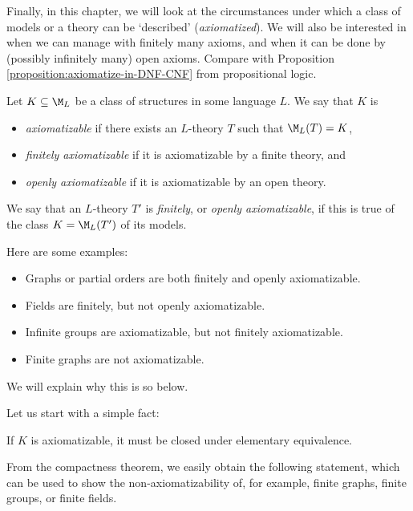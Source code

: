 Finally, in this chapter, we will look at the circumstances under which a class of models or a theory can be `described' (\emph{axiomatized}). We will also be interested in when we can manage with finitely many axioms, and when it can be done by (possibly infinitely many) open axioms. Compare with Proposition \ref{proposition:axiomatize-in-DNF-CNF} from propositional logic.

\begin{definition}[Axiomatizability]
Let $K \subseteq \M_L$ be a class of structures in some language $L$. We say that $K$ is
\begin{itemize}
    \item \emph{axiomatizable} if there exists an $L$-theory $T$ such that $\M_L(T)=K$,
    \item \emph{finitely axiomatizable} if it is axiomatizable by a finite theory, and
    \item \emph{openly axiomatizable} if it is axiomatizable by an open theory.
\end{itemize}
We say that an $L$-theory $T'$ is \emph{finitely}, or \emph{openly axiomatizable}, if this is true of the class $K=\M_L(T')$ of its models.
\end{definition}

\begin{example}
    Here are some examples:
    \begin{itemize}
        \item Graphs or partial orders are both finitely and openly axiomatizable.
        \item Fields are finitely, but not openly axiomatizable.
        \item Infinite groups are axiomatizable, but not finitely axiomatizable.
        \item Finite graphs are not axiomatizable.
    \end{itemize}
    We will explain why this is so below.
\end{example}

Let us start with a simple fact:

\begin{observation}
    If $K$ is axiomatizable, it must be closed under elementary equivalence.  
\end{observation}

From the compactness theorem, we easily obtain the following statement, which can be used to show the non-axiomatizability of, for example, finite graphs, finite groups, or finite fields.

